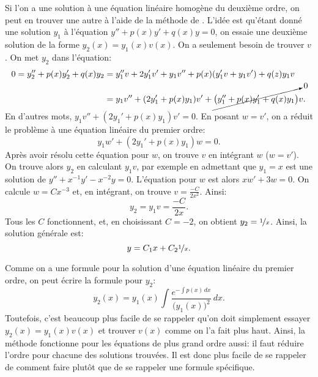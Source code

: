 \medskip

Si l'on a une solution à une équation linéaire homogène du deuxième ordre, on peut en trouver une autre à l'aide de la méthode de  \emph{}.  
L'idée est qu'étant donné une solution $y_1$ à l'équation
$y'' + p(x) y' + q(x) y = 0$, on essaie une deuxième solution de la forme $y_2(x) = y_1(x) v(x)$.
On a seulement besoin de trouver $v$.  On met $y_2$ dans l'équation:
\begin{align*}
	0 =  y_2'' + p(x) y_2' + q(x) y_2 
	& =  y_1'' v + 2 y_1' v' + y_1 v''
			+ p(x) ( y_1' v + y_1 v' )
			+ q(z) y_1 v \\
	& = y_1 v'' + (2 y_1' + p(x) y_1) v'
		+ \cancelto{0}{\bigl( y_1'' + p(x) y_1' + q(x) y_1 \bigr)} v .
\end{align*}
En d'autres mots,  $y_1 v'' + (2 y_1' + p(x) y_1) v' = 0$.  
En posant $w = v'$, on a réduit le problème à une équation linéaire du premier ordre:
\begin{equation*}
	y_1 w' + (2 y_1' + p(x) y_1) w = 0.
\end{equation*}
%
Après avoir résolu cette équation pour $w$,
on trouve $v$ en intégrant $w$ ($w=v'$).  On trouve alors $y_2$ en calculant
$y_1 v$, par exemple en admettant que $y_1 = x$ est une solution
de $y''+x^{-1}y'-x^{-2} y=0$.
L'équation pour $w$ est alors
$xw' + 3 w = 0$.  On calcule $w = Cx^{-3}$ et, en intégrant, on trouve  $v = \frac{-C}{2x^2}$.
Ainsi:
\begin{equation*}
	y_2 = y_1 v = \frac{-C}{2x}.
\end{equation*}
%
Tous les $C$ fonctionnent, et, en choisissant $C=-2$, 
on obtient $y_2 = \nicefrac{1}{x}$.  Ainsi, la solution générale est:
\begin{equation*}
	y = C_1 x + C_2\nicefrac{1}{x}.
\end{equation*}

Comme on a une formule pour la solution d'une équation linéaire du premier ordre, 
on peut écrire la formule pour $y_2$:
\begin{equation*}
	y_2(x) = y_1(x) \int \frac{e^{-\int p(x)\,dx}}{{\bigl(y_1(x)\bigr)}^2} \,dx.
\end{equation*}
Toutefois, c'est beaucoup plus facile de se rappeler qu'on doit simplement essayer $y_2(x) =
y_1(x) v(x)$ et trouver $v(x)$ comme on l'a fait plus haut.  
Ainsi, la méthode fonctionne pour les équations de plus grand ordre aussi: 
il faut réduire l'ordre pour chacune des solutions trouvées. 
Il est donc plus facile de se rappeler de comment faire plutôt que de se rappeler une formule spécifique. 



